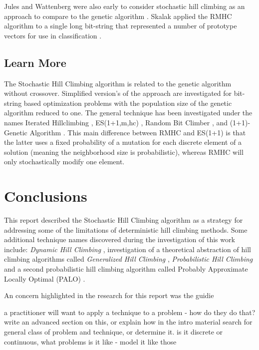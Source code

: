 \documentclass[a4paper, 11pt]{article}
\begin{document}
Jules and Wattenberg were also early to consider stochastic hill climbing as an approach to compare to the genetic algorithm \cite{Juels1994}.
Skalak applied the RMHC algorithm to a single long bit-string that represented a number of prototype vectors for use in classification \cite{Skalak1994}.

% 
% 
\subsection{Learn More}
The Stochastic Hill Climbing algorithm is related to the genetic algorithm without crossover. Simplified version's of the approach are investigated for bit-string based optimization problems with the population size of the genetic algorithm reduced to one. The general technique has been investigated under the names Iterated Hillclimbing \cite{Muhlenbein1991}, ES(1+1,m,hc) \cite{Muhlenbein1992}, Random Bit Climber \cite{Davis1991}, and (1+1)-Genetic Algorithm \cite{Back1993}. This main difference between RMHC and ES(1+1) is that the latter uses a fixed probability of a mutation for each discrete element of a solution (meaning the neighborhood size is probabilistic), whereas RMHC will only stochastically modify one element.

% 
% 
\section{Conclusions}
\label{sec:conclusions}
This report described the Stochastic Hill Climbing algorithm as a strategy for addressing some of the limitations of deterministic hill climbing methods.
Some additional technique names discovered during the investigation of this work include: \emph{Dynamic Hill Climbing} \cite{Yuret1993}, investigation of a theoretical abstraction of hill climbing algorithms called \emph{Generalized Hill Climbing} \cite{Johnson2002, Sullivan2001}, \emph{Probabilistic Hill Climbing} \cite{Romeo1984} and a second probabilistic hill climbing algorithm called Probably Approximate Locally Optimal (PALO) \cite{Cohen1994}.

An concern highlighted in the research for this report was the guidie

a practitioner will want to apply a technique to a problem - how do they do that?
write an advanced section on this, or explain how in the intro material
search for general class of problem and technique, or determine it. is it discrete or continuous, what problems is it like - model it like those
\end{document}

